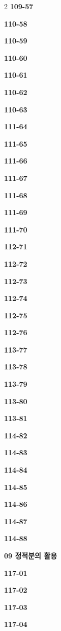 \documentclass[10pt,a4paper]{article}
\begin{document}
\begin{multicols}{2}
\noindent\textbf{109-57}\ \par
\noindent\textbf{110-58}\ \par
\noindent\textbf{110-59}\ \par
\noindent\textbf{110-60}\ \par
\noindent\textbf{110-61}\ \par
\noindent\textbf{110-62}\ \par
\noindent\textbf{110-63}\ \par
\noindent\textbf{111-64}\ \par
\noindent\textbf{111-65}\ \par
\noindent\textbf{111-66}\ \par
\noindent\textbf{111-67}\ \par
\noindent\textbf{111-68}\ \par
\noindent\textbf{111-69}\ \par
\noindent\textbf{111-70}\ \par
\noindent\textbf{112-71}\ \par
\noindent\textbf{112-72}\ \par
\noindent\textbf{112-73}\ \par
\noindent\textbf{112-74}\ \par
\noindent\textbf{112-75}\ \par
\noindent\textbf{112-76}\ \par
\noindent\textbf{113-77}\ \par
\noindent\textbf{113-78}\ \par
\noindent\textbf{113-79}\ \par
\noindent\textbf{113-80}\ \par
\noindent\textbf{113-81}\ \par
\noindent\textbf{114-82}\ \par
\noindent\textbf{114-83}\ \par
\noindent\textbf{114-84}\ \par
\noindent\textbf{114-85}\ \par
\noindent\textbf{114-86}\ \par
\noindent\textbf{114-87}\ \par
\noindent\textbf{114-88}\ \par
\noindent\textbf{09 정적분의 활용}\par\smallskip
\noindent\textbf{117-01}\ \par
\noindent\textbf{117-02}\ \par
\noindent\textbf{117-03}\ \par
\noindent\textbf{117-04}\ \par

\end{multicols}
\end{document}
